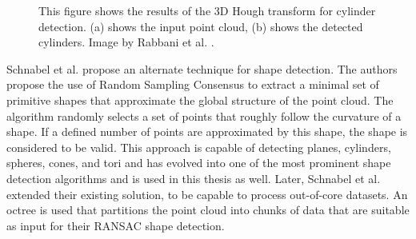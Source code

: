 \begin{figure}
\centering
{}
\caption[Results of 3d Hough transform used to detect cylinders]
{This figure shows the results of the 3D Hough transform for cylinder detection. (a) shows the input point cloud, (b) shows the detected cylinders. Image by Rabbani et al. \cite{rabbani2005efficient}.}
\label{fig:hough_cylinder}
\end{figure}


Schnabel et al. \cite{schnabel-2007-efficient} propose an alternate technique for shape detection. The authors propose the use of Random Sampling Consensus \cite{fischler1981random} to extract a minimal set of primitive shapes that approximate the global structure of the point cloud. The algorithm randomly selects a set of points that roughly follow the curvature of a shape. If a defined number of points are approximated by this shape, the shape is considered to be valid. This approach is capable of detecting planes, cylinders, spheres, cones, and tori and has evolved into one of the most prominent shape detection algorithms and is used in this thesis as well. Later, Schnabel et al. \cite{schnabel-2007-ransac} extended their existing solution, to be capable to process out-of-core datasets. An octree is used that partitions the point cloud into chunks of data that are suitable as input for their RANSAC shape detection. 

